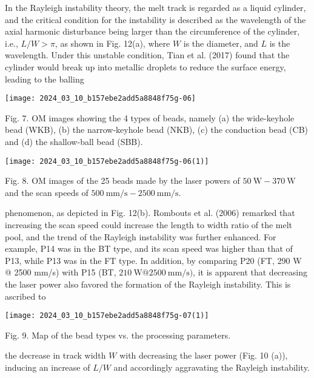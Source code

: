 \documentclass[10pt]{article}
\begin{document}
In the Rayleigh instability theory, the melt track is regarded as a liquid cylinder, and the critical condition for the instability is described as the wavelength of the axial harmonic disturbance being larger than the circumference of the cylinder, i.e., $L / W>\pi$, as shown in Fig. 12(a), where $W$ is the diameter, and $L$ is the wavelength. Under this unstable condition, Tian et al. (2017) found that the cylinder would break up into metallic droplets to reduce the surface energy, leading to the balling

\begin{center}
\texttt{[image: 2024\_03\_10\_b157ebe2add5a8848f75g-06]}
\end{center}

Fig. 7. OM images showing the 4 types of beads, namely (a) the wide-keyhole bead (WKB), (b) the narrow-keyhole bead (NKB), (c) the conduction bead (CB) and (d) the shallow-ball bead (SBB).

\begin{center}
\texttt{[image: 2024\_03\_10\_b157ebe2add5a8848f75g-06(1)]}
\end{center}

Fig. 8. OM images of the 25 beads made by the laser powers of $50 \mathrm{~W}-370 \mathrm{~W}$ and the scan speeds of $500 \mathrm{~mm} / \mathrm{s}-2500 \mathrm{~mm} / \mathrm{s}$.

phenomenon, as depicted in Fig. 12(b). Rombouts et al. (2006) remarked that increasing the scan speed could increase the length to width ratio of the melt pool, and the trend of the Rayleigh instability was further enhanced. For example, P14 was in the BT type, and its scan speed was higher than that of P13, while P13 was in the FT type. In addition, by comparing P20 (FT, 290 W @ 2500 mm/s) with P15 (BT, $210 \mathrm{~W} @ 2500 \mathrm{~mm} / \mathrm{s})$, it is apparent that decreasing the laser power also favored the formation of the Rayleigh instability. This is ascribed to

\begin{center}
\texttt{[image: 2024\_03\_10\_b157ebe2add5a8848f75g-07(1)]}
\end{center}

Fig. 9. Map of the bead types vs. the processing parameters.

the decrease in track width $W$ with decreasing the laser power (Fig. 10 (a)), inducing an increase of $L / W$ and accordingly aggravating the Rayleigh instability.
\end{document}
